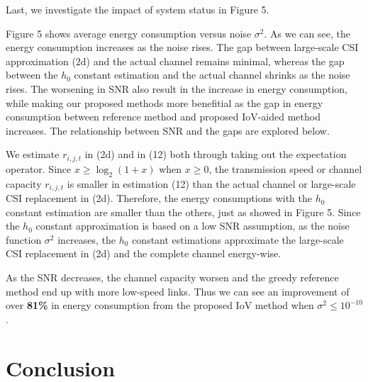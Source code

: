 \documentclass[conference]{IEEEtran}
\begin{document}
Last, we investigate the impact of system status in Figure 5.

Figure 5 shows average energy consumption versus noise ${\sigma ^2}$. As we can see, the energy consumption increases as the noise rises. The gap between large-scale CSI approximation (2d) and the actual channel remains minimal, whereas the gap between the ${h_0}$ constant estimation and the actual channel shrinks as the noise rises. %
The worsening in SNR also result in the increase in energy consumption, while making our proposed methods more benefitial as the gap in energy consumption between reference method and proposed IoV-aided method increases. The relationship between SNR and the gaps are explored below. 

We estimate ${r_{i,j,t}}$ in (2d) and in (12) both through taking out the expectation operator. Since $x \ge {\log _2}\left( {1 + x} \right)$ when ${x \ge 0}$, the transmission speed or channel capacity ${r_{i,j,t}}$ is smaller in estimation (12) than the actual channel or large-scale CSI replacement in (2d). Therefore, the energy consumptions with the ${h_0}$ constant estimation are smaller than the others, just as showed in Figure 5. 
Since the ${h_0}$ constant approximation is based on a low SNR assumption, as the noise function ${\sigma ^2}$ increases, the ${h_0}$ constant estimations approximate the large-scale CSI replacement in (2d) and the complete channel energy-wise.

As the SNR decreases, the channel capacity worsen and the greedy reference method end up with more low-speed links. Thus we can see an improvement of over \textbf{81\%} in energy consumption from the proposed IoV method when ${\sigma ^2 \le{10^{ - 10}}}$.


\section{Conclusion}\label{sec:5}
\end{document}
